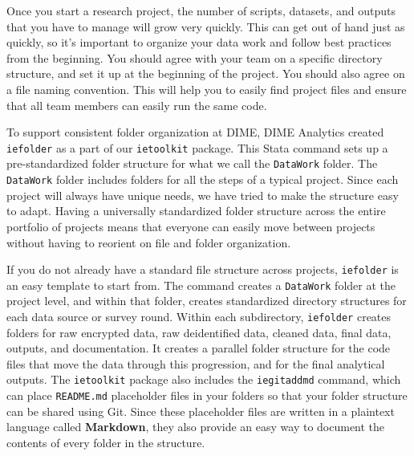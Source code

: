 Once you start a research project,
the number of scripts, datasets, and outputs that you have to manage will grow very quickly.
This can get out of hand just as quickly,
so it's important to organize your data work and follow best practices from the beginning.
You should agree with your team on a specific directory structure,
and set it up at the beginning of the project.
You should also agree on a file naming convention.
This will help you to easily find project files and
ensure that all team members can easily run the same code.

To support consistent folder organization at DIME,
DIME Analytics created \texttt{iefolder}
as a part of our \texttt{ietoolkit} package.
This Stata command sets up a pre-standardized folder structure
for what we call the \texttt{DataWork} folder.
The \texttt{DataWork} folder includes folders for all the steps of a typical project.
Since each project will always have unique needs,
we have tried to make the structure easy to adapt.
Having a universally standardized folder structure
across the entire portfolio of projects
means that everyone can easily move between projects
without having to reorient on file and folder organization.

If you do not already have a standard file structure across projects,
\texttt{iefolder} is an easy template to start from.
The command creates a \texttt{DataWork} folder at the project level,
and within that folder, creates standardized directory structures
for each data source or survey round.
Within each subdirectory, \texttt{iefolder} creates folders for raw encrypted data,
raw deidentified data, cleaned data, final data, outputs, and documentation.
It creates a parallel folder structure for the code files
that move the data through this progression,
and for the final analytical outputs.
The \texttt{ietoolkit} package also includes the \texttt{iegitaddmd} command,
which can place \texttt{README.md} placeholder files in your folders so that
your folder structure can be shared using Git.
Since these placeholder files are written in a plaintext language called \textbf{Markdown},
they also provide an easy way to document the contents of every folder in the structure.

